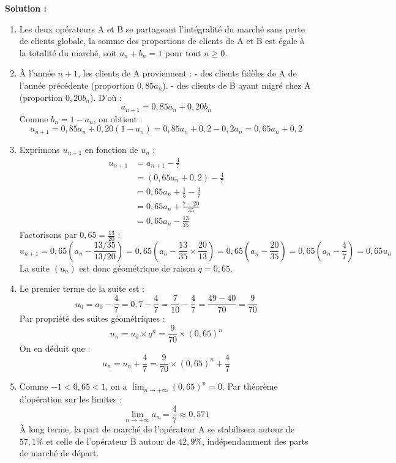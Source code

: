 \textbf{Solution :}
\begin{enumerate}
    \item Les deux opérateurs A et B se partageant l'intégralité du marché sans perte de clients globale, la somme des proportions de clients de A et B est égale à la totalité du marché, soit $a_n + b_n = 1$ pour tout $n \ge 0$.
    
    \item À l'année $n+1$, les clients de A proviennent :
    - des clients fidèles de A de l'année précédente (proportion $0,85 a_n$).
    - des clients de B ayant migré chez A (proportion $0,20 b_n$).
    D'où :
    \[
    a_{n+1} = 0,85 a_n + 0,20 b_n
    \]
    Comme $b_n = 1 - a_n$, on obtient :
    \[
    a_{n+1} = 0,85 a_n + 0,20(1 - a_n) = 0,85 a_n + 0,2 - 0,2 a_n = 0,65 a_n + 0,2
    \]
    
    \item Exprimons $u_{n+1}$ en fonction de $u_n$ :
    \[
    \begin{aligned}
    u_{n+1} &= a_{n+1} - \frac{4}{7} \\
    &= (0,65 a_n + 0,2) - \frac{4}{7} \\
    &= 0,65 a_n + \frac{1}{5} - \frac{4}{7} \\
    &= 0,65 a_n + \frac{7 - 20}{35} \\
    &= 0,65 a_n - \frac{13}{35}
    \end{aligned}
    \]
    Factorisons par $0,65 = \frac{13}{20}$ :
    \[
    u_{n+1} = 0,65 \left( a_n - \frac{13/35}{13/20} \right) = 0,65 \left( a_n - \frac{13}{35} \times \frac{20}{13} \right) = 0,65 \left( a_n - \frac{20}{35} \right) = 0,65 \left( a_n - \frac{4}{7} \right) = 0,65 u_n
    \]
    La suite $(u_n)$ est donc géométrique de raison $q = 0,65$.
    
    \item Le premier terme de la suite est :
    \[
    u_0 = a_0 - \frac{4}{7} = 0,7 - \frac{4}{7} = \frac{7}{10} - \frac{4}{7} = \frac{49 - 40}{70} = \frac{9}{70}
    \]
    Par propriété des suites géométriques :
    \[
    u_n = u_0 \times q^n = \frac{9}{70} \times (0,65)^n
    \]
    On en déduit que :
    \[
    a_n = u_n + \frac{4}{7} = \frac{9}{70} \times (0,65)^n + \frac{4}{7}
    \]
    
    \item Comme $-1 < 0,65 < 1$, on a $\lim_{n \to +\infty} (0,65)^n = 0$.
    Par théorème d'opération sur les limites :
    \[
    \lim_{n \to +\infty} a_n = \frac{4}{7} \approx 0,571
    \]
    À long terme, la part de marché de l'opérateur A se stabilisera autour de $57,1\%$ et celle de l'opérateur B autour de $42,9\%$, indépendamment des parts de marché de départ.
\end{enumerate}

